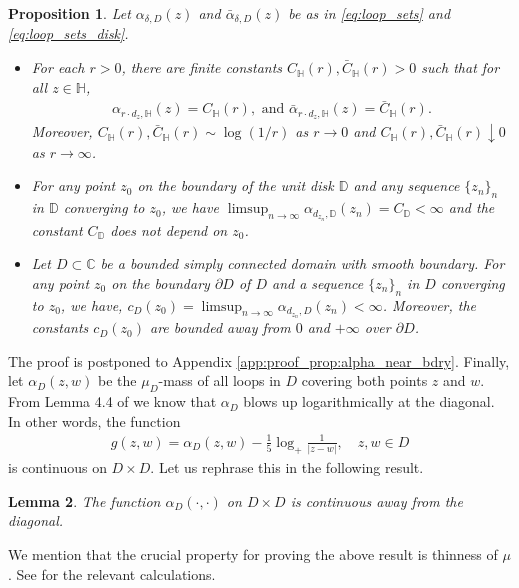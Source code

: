 \documentclass[a4paper, 11pt, reqno]{amsart}
\theoremstyle{definition} \newtheorem{defn}{Definition}[section]
\theoremstyle{remark} \newtheorem{rem}[defn]{Remark}
\theoremstyle{remark} \newtheorem*{rem*}{Remark}
\theoremstyle{plain} \newtheorem{thm}[defn]{Theorem}
\theoremstyle{plain} \newtheorem{lem}[defn]{Lemma}
\theoremstyle{plain} \newtheorem{prop}[defn]{Proposition}
\theoremstyle{plain} \newtheorem{cor}[defn]{Corollary}
\theoremstyle{remark} \newtheorem{exm}[defn]{\textbf{Example}}
\theoremstyle{remark} \newtheorem{exms}[defn]{\textbf{Examples}}
\theoremstyle{remark} \newtheorem*{bl}{}
\numberwithin{equation}{section} %
\newcommand{\x}{\times}
\newcommand{\C}{\mathbb{C}}
\newcommand{\D}{\mathbb{D}}
\newcommand{\bH}{\mathbb{H}}
\begin{document}
     \begin{prop}\label{prop:alpha_near_bdry}
         Let $\alpha_{\delta, D}(z)$ and $\bar{\alpha}_{\delta, D}(z)$ be as in \eqref{eq:loop_sets} and \eqref{eq:loop_sets_disk}.
         \begin{itemize}
             \item[(i)] For each $r>0$, there are finite constants $C_{\bH}(r), \bar{C}_{\bH}(r)>0$ such that for all $z \in \bH$,             \begin{align}\label{eq:alpha_H_near_bdry_0}
                 \alpha_{r\cdot d_z, \bH}(z) = C_{\bH}(r),  \text{ and } \bar{\alpha}_{r\cdot d_z, \bH}(z) = \bar{C}_{\bH}(r). 
             \end{align}
             Moreover, $C_{\bH}(r), \bar{C}_{\bH}(r) \sim \log(1/r)$ as $r \to 0$ and $C_{\bH}(r), \bar{C}_{\bH}(r) \downarrow 0$ as $r \to \infty$.

             \item[(ii)] For any point $z_0$ on the boundary of the unit disk $\D$ and any sequence $\{z_n\}_n$ in $\D$ converging to $z_0$, we have $\limsup_{n \to \infty} \alpha_{d_{z_n}, \D}(z_n) = C_{\D} < \infty$ and the constant $C_{\D}$ does not depend on $z_0$.    

             \item[(iii)] Let $D\subset \C$ be a bounded simply connected domain with smooth boundary. For any point $z_0$ on the boundary $\partial D$ of $D$ and a sequence $\{z_n\}_n$ in $D$ converging to $z_0$, we have, $ c_D(z_0) = \limsup_{n \to \infty} \alpha_{d_{z_n}, D}(z_n) <\infty$. Moreover, the constants $c_D(z_0)$ are bounded away from $0$ and $+\infty$ over $\partial D$.
          \end{itemize}
     \end{prop}

    The proof is postponed to Appendix \ref{app:proof_prop:alpha_near_bdry}.     Finally, let $\alpha_{D}(z, w)$ be the $\mu_D$-mass of all loops in $D$ covering both points $z$ and $w$. From Lemma 4.4 of \cite{cgpr21} we know that $\alpha_D$ blows up logarithmically at the diagonal. In other words, the function
     \begin{align}
             g(z, w) = \alpha_D(z, w) - \frac{1}{5} \log_+ \frac{1}{|z-w|}, \quad z, w \in D
         \end{align}
    is continuous on $D\x D$. Let us rephrase this in the following result. 
     \begin{lem}\label{lem:alpha_cont}
         The function $\alpha_D(\cdot, \cdot)$ on $D\x D$ is continuous away from the diagonal. 
     \end{lem}
     We mention that the crucial property for proving the above result is thinness of $\mu$. See \cite[p. 932]{cgpr21} for the relevant calculations. 
     
\end{document}
